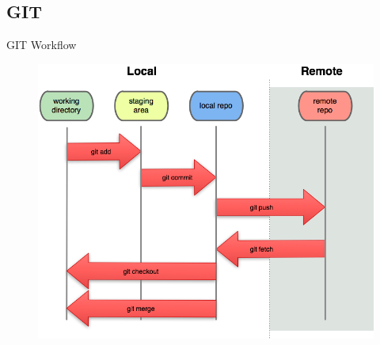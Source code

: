 \subsection{GIT}
\begin{frame}{GIT Workflow}
	\begin{figure}
		\includegraphics[width=0.75\linewidth]{images/local-remote.png}
	\end{figure}
\end{frame}

